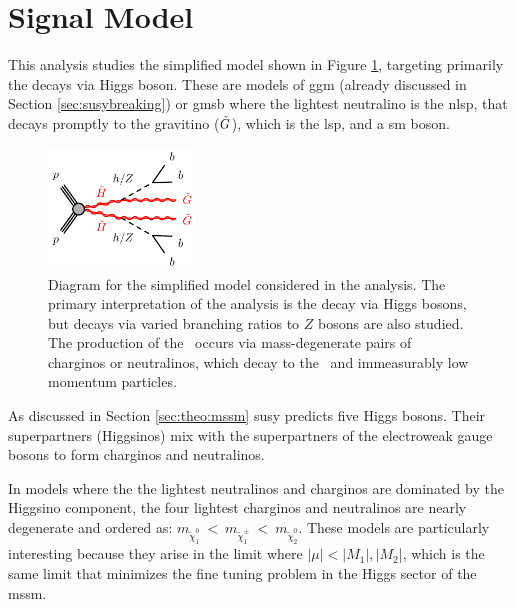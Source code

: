 
\section{Signal Model}
\label{sec:ewk:sig}

This analysis studies the simplified model shown in Figure \ref{fig:feyn}, targeting primarily the decays via Higgs boson.
These are models of \gls{ggm} \cite{Meade:2008wd,Cheung:2007es,Dine:1981gu,AlvarezGaume:1981wy,Nappi:1982hm} 
(already discussed in Section \ref{sec:susybreaking})
or \gls{gmsb} \cite{Dimopoulos:1996vz,Matchev:1999ft} where 
the lightest neutralino is the \gls{nlsp}, that decays promptly to the gravitino ($\tilde{G}$), which is the \gls{lsp}, and 
a \gls{sm} boson. 

\begin{figure}[htbp]
	\centering
	\includegraphics[width=0.35\textwidth]{figures/ewk_prod/varie/N1N1-hhGG-bbbb_Z}
	\caption{Diagram for the simplified model considered in the analysis. The primary interpretation of the analysis is the decay via Higgs bosons, but decays via varied branching ratios to $Z$ bosons are also studied. The production of the \hino\ occurs
via mass-degenerate pairs of charginos or neutralinos, which decay to the \ninoone\ and immeasurably low momentum particles.} 
	\label{fig:feyn}
\end{figure}

As discussed in Section \ref{sec:theo:mssm} \gls{susy} predicts five Higgs bosons. 
Their superpartners (Higgsinos) mix with the superpartners of the electroweak gauge bosons to form charginos and neutralinos.

In models where the the lightest neutralinos and charginos are dominated by the Higgsino component, the four lightest charginos 
and neutralinos are nearly degenerate \cite{Papucci:2011wy,Barbieri:2009ev,Han:2014kaa} and ordered as: $m_{\tilde\chi^0_1}~<~m_{\tilde\chi^\pm_1}~<~m_{\tilde\chi^0_2}$.
These models are particularly interesting because they arise in the limit where $|\mu| < |M_1|, |M_2$|, which is the same limit 
that minimizes the fine tuning problem in the Higgs sector of the \gls{mssm}.

